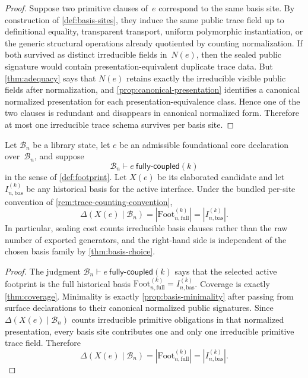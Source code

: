 \documentclass{lmcs}
\newcommand{\B}{\mathcal{B}}
\newcommand{\Foot}{\mathrm{Foot}}
\begin{document}
\begin{proof}
Suppose two primitive clauses of~$e$ correspond to the same basis site. By construction of \autoref{def:basis-sites}, they induce the same public trace field up to definitional equality, transparent transport, uniform polymorphic instantiation, or the generic structural operations already quotiented by counting normalization. If both survived as distinct irreducible fields in~$N(e)$, then the sealed public signature would contain presentation-equivalent duplicate trace data. But \autoref{thm:adequacy} says that $N(e)$ retains exactly the irreducible visible public fields after normalization, and \autoref{prop:canonical-presentation} identifies a canonical normalized presentation for each presentation-equivalence class. Hence one of the two clauses is redundant and disappears in canonical normalized form. Therefore at most one irreducible trace schema survives per basis site.
\end{proof}

\begin{thm}
\label{thm:canonicity}
Let $\B_n$ be a library state, let $e$ be an admissible foundational core
declaration over~$\B_n$, and suppose
\[
  \B_n \vdash e\ \mathsf{fully\text{-}coupled}(k)
\]
in the sense of \autoref{def:footprint}. Let $X(e)$ be its elaborated
candidate and let $I_{n,\mathrm{bas}}^{(k)}$ be any historical basis for the
active interface. Under the bundled per-site convention of
\autoref{rem:trace-counting-convention},
\[
  \Delta(X(e) \mid \B_n) = |\Foot_{n,\mathrm{full}}^{(k)}|
  = |I_{n,\mathrm{bas}}^{(k)}|.
\]
\noindent
In particular, sealing cost counts irreducible basis clauses rather than the
raw number of exported generators, and the right-hand side is independent of
the chosen basis family by \autoref{thm:basis-choice}.
\end{thm}

\begin{proof}
The judgment $\B_n\vdash e\ \mathsf{fully\text{-}coupled}(k)$ says that the
selected active footprint is the full historical basis
$\Foot_{n,\mathrm{full}}^{(k)}=I_{n,\mathrm{bas}}^{(k)}$. Coverage is exactly
\autoref{thm:coverage}. Minimality is exactly
\autoref{prop:basis-minimality} after passing from surface declarations to
their canonical normalized public signatures. Since
$\Delta(X(e) \mid \B_n)$ counts irreducible primitive obligations in that
normalized presentation, every basis site contributes one and only one
irreducible primitive trace field. Therefore
\[
  \Delta(X(e) \mid \B_n)
  =
  |\Foot_{n,\mathrm{full}}^{(k)}|
  =
  |I_{n,\mathrm{bas}}^{(k)}|.
\]
\end{proof}
\end{document}
